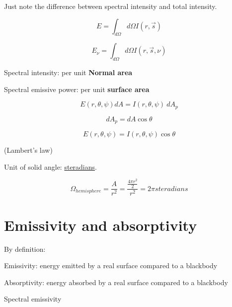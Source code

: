\documentclass[12pt]{article}
\renewcommand{\_}{\kern-1.5pt\textunderscore\kern-1.5pt}
\begin{document}
Just note the difference between spectral intensity and total intensity. \par

 \[ E= \int _{d \Omega }^{}d \Omega  I \left( r,\overrightarrow{s} \right)  \] \par

 \[ E_{ \nu }= \int _{d \Omega }^{}d \Omega I \left( r,\overrightarrow{s}, \nu  \right)  \] \par

\par

Spectral intensity: per unit \textbf{Normal area}\par

Spectral emissive power: per unit \textbf{surface area}\par

 \[ E \left( r, \theta , \psi  \right)  dA=I \left( r, \theta , \psi  \right) ~dA_{p} \] \par

 \[ dA_{p}=dA\cos  \theta  \] \par

 \[ E \left( r, \theta , \psi  \right)  =I \left( r, \theta , \psi  \right) \cos  \theta  \] \par

(Lambert’s law)\par

Unit of solid angle: \uline{steradians}.\par

 \[  \Omega _{hemisphere}=\frac{A}{r^{2}}=\frac{\frac{4 \pi r^{2}}{2}}{r^{2}}=2 \pi  steradians  \] \par

\section*{Emissivity and absorptivity}
By definition:\par

Emissivity: energy emitted by a real surface compared to a blackbody\par

Absorptivity: energy absorbed by a real surface compared to a blackbody\par

\par

Spectral emissivity\par
\end{document}
